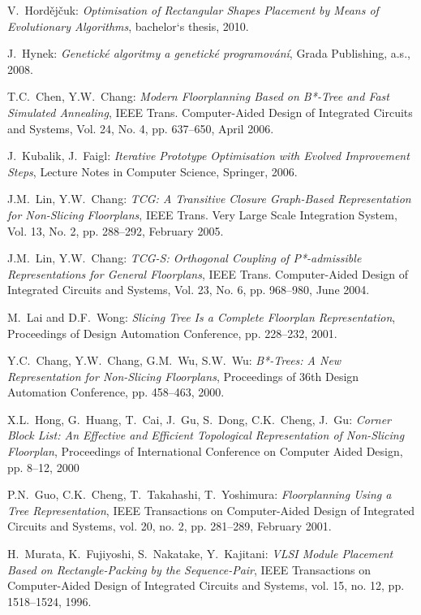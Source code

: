 \begin{thebibliography}{1}

{V.~Hordějčuk:
{\em Optimisation of Rectangular Shapes Placement by Means of Evolutionary Algorithms},
bachelor`s thesis,
2010.}

{J.~Hynek:
{\em Genetické algoritmy a genetické programování},
Grada Publishing, a.s.,
2008.}

{T.C.~Chen, Y.W.~Chang:
{\em Modern Floorplanning Based on B*-Tree and Fast Simulated Annealing},
IEEE Trans. Computer-Aided Design of Integrated Circuits and Systems, Vol. 24, No. 4, pp. 637--650,
April 2006.}

{J.~Kubalik, J.~Faigl:
{\em Iterative Prototype Optimisation with Evolved Improvement Steps},
Lecture Notes in Computer Science, Springer,
2006.}

{J.M.~Lin, Y.W.~Chang:
{\em TCG: A Transitive Closure Graph-Based Representation for Non-Slicing Floorplans},
IEEE Trans. Very Large Scale Integration System, Vol. 13, No. 2, pp. 288--292,
February 2005.}

{J.M.~Lin, Y.W.~Chang:
{\em TCG-S: Orthogonal Coupling of P*-admissible Representations for General Floorplans},
IEEE Trans. Computer-Aided Design of Integrated Circuits and Systems, Vol. 23, No. 6, pp. 968--980,
June 2004.}

{M.~Lai and D.F.~Wong:
{\em Slicing Tree Is a Complete Floorplan Representation},
Proceedings of Design Automation Conference, pp. 228--232,
2001.}

{Y.C.~Chang, Y.W.~Chang, G.M.~Wu, S.W.~Wu:
{\em B*-Trees: A New Representation for Non-Slicing Floorplans},
Proceedings of 36th Design Automation Conference, pp. 458--463,
2000.}

{X.L.~Hong, G.~Huang, T.~Cai, J.~Gu, S.~Dong, C.K.~Cheng, J.~Gu:
{\em Corner Block List: An Effective and Efficient Topological Representation of Non-Slicing Floorplan},
Proceedings of International Conference on Computer Aided Design, pp. 8--12, 
2000}

{P.N.~Guo, C.K.~Cheng, T.~Takahashi, T.~Yoshimura:
{\em Floorplanning Using a Tree Representation},
IEEE Transactions on Computer-Aided Design of Integrated Circuits and Systems, vol. 20, no. 2, pp. 281--289, 
February 2001.}

{H.~Murata, K.~Fujiyoshi, S.~Nakatake, Y.~Kajitani:
{\em VLSI Module Placement Based on Rectangle-Packing by the Sequence-Pair},
IEEE Transactions on Computer-Aided Design of Integrated Circuits and Systems, vol. 15, no. 12, pp. 1518--1524, 
1996.}


\end{thebibliography}
